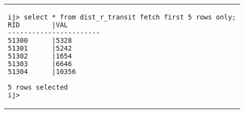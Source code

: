 \begin{tabular}{p{}}
\begin{verbatim}
ij> select * from dist_r_transit fetch first 5 rows only;
RID        |VAL
-----------------------
51300      |5328
51301      |5242
51302      |1654
51303      |6646
51304      |10356

5 rows selected
ij>
\end{verbatim}\\
\end{tabular}

